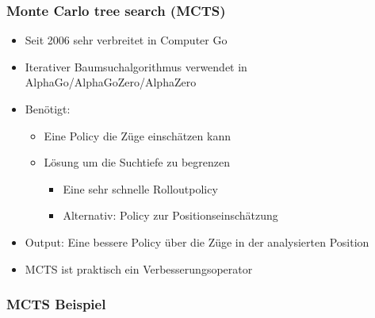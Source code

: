 \begin{frame}
 \frametitle{Monte Carlo tree search (MCTS)}
  


\begin{itemize}
  \item \pause Seit 2006 sehr verbreitet in Computer Go
  \item \pause Iterativer Baumsuchalgorithmus verwendet in AlphaGo/AlphaGoZero/AlphaZero
  \item \pause Benötigt:
\begin{itemize}
  \item \pause Eine Policy die Züge einschätzen kann
  \item \pause Lösung um die Suchtiefe zu begrenzen
\begin{itemize}
  \item \pause Eine sehr schnelle Rolloutpolicy
  \item \pause Alternativ: Policy zur Positionseinschätzung
\end{itemize}
\end{itemize}
  \item \pause Output: Eine bessere Policy über die Züge in der analysierten Position
  \item \pause MCTS ist praktisch ein Verbesserungsoperator
\end{itemize}

  
\end{frame}
\begin{frame}
 \frametitle{MCTS Beispiel}
  




  
\end{frame}
